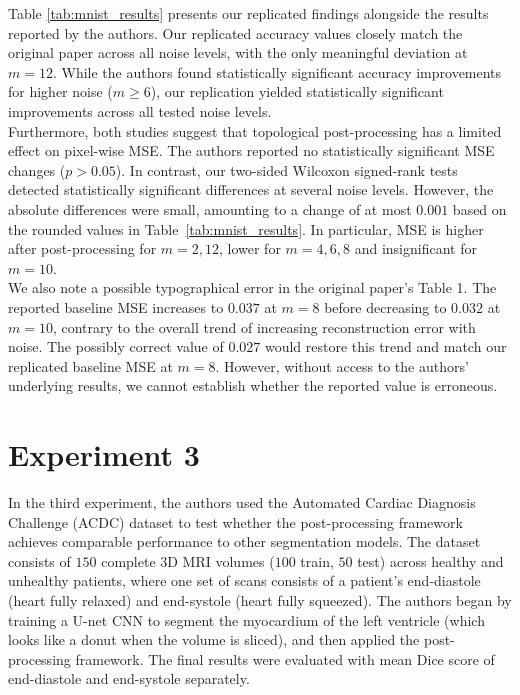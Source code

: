 Table \ref{tab:mnist_results} presents our replicated findings alongside the results reported by the authors. Our replicated accuracy values closely match the original paper across all noise levels, with the only meaningful deviation at $m=12$. While the authors found statistically significant accuracy improvements for higher noise ($m \ge 6$), our replication yielded statistically significant improvements across all tested noise levels. \\

Furthermore, both studies suggest that topological post-processing has a limited effect on pixel-wise MSE. The authors reported no statistically significant MSE changes ($p > 0.05$). In contrast, our two-sided Wilcoxon signed-rank tests detected statistically significant differences at several noise levels. However, the absolute differences were small, amounting to a change of at most $0.001$ based on the rounded values in Table~\ref{tab:mnist_results}. In particular, MSE is higher after post-processing for $m=2,12$, lower for $m=4,6,8$ and insignificant for $m=10$. \\


We also note a possible typographical error in the original paper's Table 1. The reported baseline MSE increases to $0.037$ at $m=8$ before decreasing to $0.032$ at $m=10$, contrary to the overall trend of increasing reconstruction error with noise. The possibly correct value of $0.027$ would restore this trend and match our replicated baseline MSE at $m=8$. However, without access to the authors' underlying results, we cannot establish whether the reported value is erroneous.


\section{Experiment 3}

In the third experiment, the authors used the Automated Cardiac Diagnosis Challenge (ACDC) dataset\supercite{Bernard:2018} to test whether the post-processing framework achieves comparable performance to other segmentation models. The dataset consists of $150$ complete 3D MRI volumes ($100$ train, $50$ test) across healthy and unhealthy patients, where one set of scans consists of a patient's end-diastole (heart fully relaxed) and end-systole (heart fully squeezed). The authors began by training a U-net CNN\supercite{Ronneberger:2015} to segment the myocardium of the left ventricle (which looks like a donut when the volume is sliced), and then applied the post-processing framework. The final results were evaluated with mean Dice score of end-diastole and end-systole separately.



